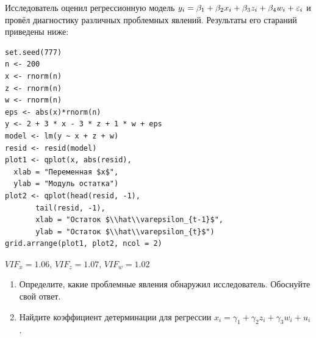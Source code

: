 \begin{problem}
Исследователь оценил регрессионную модель $y_i = \beta_1 + \beta_2 x_i + \beta_3 z_i + \beta_4 w_i + \e_i$ и провёл диагностику различных проблемных явлений. 
Результаты его стараний приведены ниже:

\begin{verbatim}
set.seed(777)
n <- 200
x <- rnorm(n)
z <- rnorm(n)
w <- rnorm(n)
eps <- abs(x)*rnorm(n)
y <- 2 + 3 * x - 3 * z + 1 * w + eps
model <- lm(y ~ x + z + w)
resid <- resid(model)
plot1 <- qplot(x, abs(resid),
  xlab = "Переменная $x$",
  ylab = "Модуль остатка")
plot2 <- qplot(head(resid, -1),
       tail(resid, -1),
       xlab = "Остаток $\\hat\\varepsilon_{t-1}$",
       ylab = "Остаток $\\hat\\varepsilon_{t}$")
grid.arrange(plot1, plot2, ncol = 2)
\end{verbatim}



\begin{minipage}{0.6\textwidth}
\begin{center}
\begin{tikzpicture}[scale = 0.025]

\end{tikzpicture}
\end{center}
\end{minipage}

$VIF_x = 1.06$, $VIF_z = 1.07$, $VIF_w = 1.02$
\begin{enumerate}
\item Определите, какие проблемные явления обнаружил исследователь. Обоснуйте свой ответ.
\item Найдите коэффициент детерминации для регрессии $x_{i} = \gamma_1 + \gamma_2 z_i + \gamma_3 w_i + u_i$.
\end{enumerate}



\begin{sol}
\end{sol}
\end{problem}



